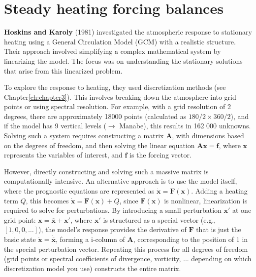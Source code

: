 \section{Steady heating forcing balances}
\textbf{Hoskins and Karoly}\cite{B.J.Hoskins1981} (1981) investigated the atmospheric response to stationary heating using a General Circulation Model (GCM) with a realistic structure. Their approach involved simplifying a complex mathematical system by linearizing the model. The focus was on understanding the stationary solutions that arise from this linearized problem.

To explore the response to heating, they used discretization methods (see Chapter\ref{ch:chapter3}). This involves breaking down the atmosphere into grid points or using spectral resolution. For example, with a grid resolution of 2 degrees, there are approximately 18000 points (calculated as $180/2\times360/2$), and if the model has 9 vertical levels ($\rightarrow$ Manabe), this results in 162 000 unknowns. Solving such a system requires constructing a matrix $\mathbf{A}$, with dimensions based on the degrees of freedom, and then solving the linear equation $\mathbf{A}\mathbf{x}=\mathbf{f}$, where
$\mathbf{x}$ represents the variables of interest, and $\mathbf{f}$ is the forcing vector.

However, directly constructing and solving such a massive matrix is computationally intensive. An alternative approach is to use the model itself, where the prognostic equations are represented as $\mathbf{\dot{x}}=\mathbf{F(x)}$. Adding a heating term $Q$, this becomes $\mathbf{\dot{x}=F(x)}+Q$, since $\mathbf{F(x)}$ is nonlinear, linearization is required to solve for perturbations. By introducing a small perturbation $\mathbf{x'}$ at one grid point: $\mathbf{x=\overline{x}+x'}$, where $\mathbf{x'}$  is structured as a special vector (e.g., $[1,0,0,\dots]$), the model’s response provides the derivative of $\mathbf{F}$ that is just the basic state $\mathbf{\dot{x}=\dot{\overline{x}}}$, forming a i-column of $\mathbf{A}$, corresponding to the position of $1$ in the special perturbation vector. Repeating this process for all degrees of freedom (grid points or spectral coefficients of divergence, vorticity, ... depending on which discretization model you use) constructs the entire matrix.

